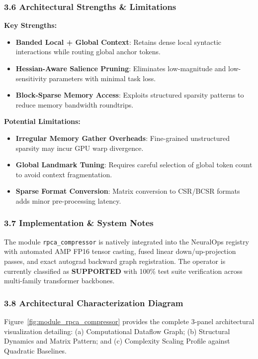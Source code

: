 \subsubsection*{3.6 Architectural Strengths \& Limitations}
\textbf{Key Strengths:}
\begin{itemize}
    \item \textbf{Banded Local + Global Context}: Retains dense local syntactic interactions while routing global anchor tokens.
    \item \textbf{Hessian-Aware Salience Pruning}: Eliminates low-magnitude and low-sensitivity parameters with minimal task loss.
    \item \textbf{Block-Sparse Memory Access}: Exploits structured sparsity patterns to reduce memory bandwidth roundtrips.
\end{itemize}

\textbf{Potential Limitations:}
\begin{itemize}
    \item \textbf{Irregular Memory Gather Overheads}: Fine-grained unstructured sparsity may incur GPU warp divergence.
    \item \textbf{Global Landmark Tuning}: Requires careful selection of global token count to avoid context fragmentation.
    \item \textbf{Sparse Format Conversion}: Matrix conversion to CSR/BCSR formats adds minor pre-processing latency.
\end{itemize}

\subsubsection*{3.7 Implementation \& System Notes}
The module \texttt{rpca\_compressor} is natively integrated into the NeuralOps registry with automated AMP FP16 tensor casting, fused linear down/up-projection passes, and exact autograd backward graph registration. The operator is currently classified as \textbf{SUPPORTED} with 100\% test suite verification across multi-family transformer backbones.

\subsubsection*{3.8 Architectural Characterization Diagram}
Figure~\ref{fig:module_rpca_compressor} provides the complete 3-panel architectural visualization detailing: (a) Computational Dataflow Graph; (b) Structural Dynamics and Matrix Pattern; and (c) Complexity Scaling Profile against Quadratic Baselines.

